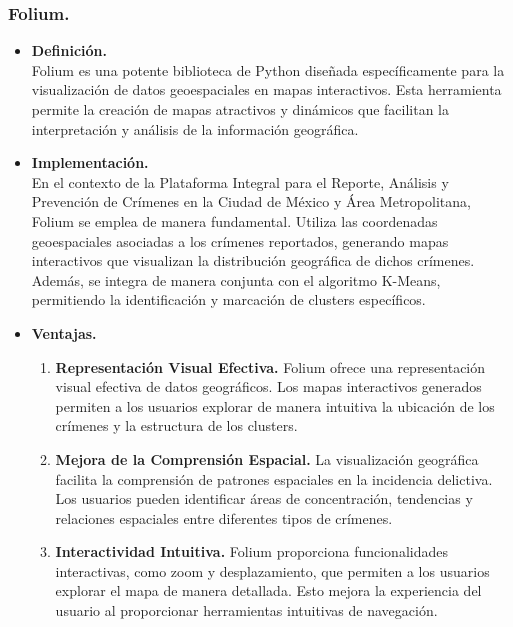 \documentclass{article}
\begin{document}
        \subsubsection{Folium.}
            \begin{itemize}
                \item \textbf{Definición.}\\
                Folium es una potente biblioteca de Python diseñada específicamente para la visualización de datos geoespaciales en mapas interactivos. Esta herramienta permite la creación de mapas atractivos y dinámicos que facilitan la interpretación y análisis de la información geográfica.

                \item \textbf{Implementación.}\\
                En el contexto de la Plataforma Integral para el Reporte, Análisis y Prevención de Crímenes en la Ciudad de México y Área Metropolitana, Folium se emplea de manera fundamental. Utiliza las coordenadas geoespaciales asociadas a los crímenes reportados, generando mapas interactivos que visualizan la distribución geográfica de dichos crímenes. Además, se integra de manera conjunta con el algoritmo K-Means, permitiendo la identificación y marcación de clusters específicos.

                \item \textbf{Ventajas.}\\
                \begin{enumerate}
                    \item \textbf{Representación Visual Efectiva.} Folium ofrece una representación visual efectiva de datos geográficos. Los mapas interactivos generados permiten a los usuarios explorar de manera intuitiva la ubicación de los crímenes y la estructura de los clusters.

                    \item \textbf{Mejora de la Comprensión Espacial.} La visualización geográfica facilita la comprensión de patrones espaciales en la incidencia delictiva. Los usuarios pueden identificar áreas de concentración, tendencias y relaciones espaciales entre diferentes tipos de crímenes.

                    \item \textbf{Interactividad Intuitiva.} Folium proporciona funcionalidades interactivas, como zoom y desplazamiento, que permiten a los usuarios explorar el mapa de manera detallada. Esto mejora la experiencia del usuario al proporcionar herramientas intuitivas de navegación.


\end{enumerate}
\end{itemize}
\end{document}
